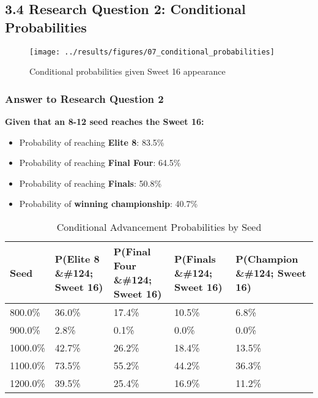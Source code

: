 \documentclass[
]{article}
\providecommand{\tightlist}{%
  \setlength{\itemsep}{0pt}\setlength{\parskip}{0pt}}
\begin{document}
\subsection{3.4 Research Question 2: Conditional
Probabilities}\label{research-question-2-conditional-probabilities}

\begin{figure}

{\centering \texttt{[image: ../results/figures/07\_conditional\_probabilities]} 

}

\caption{Conditional probabilities given Sweet 16 appearance}\label{fig:conditional-plot}
\end{figure}

\subsubsection{Answer to Research Question
2}\label{answer-to-research-question-2}

\textbf{Given that an 8-12 seed reaches the Sweet 16:}

\begin{itemize}
\tightlist
\item
  Probability of reaching \textbf{Elite 8}: 83.5\%
\item
  Probability of reaching \textbf{Final Four}: 64.5\%
\item
  Probability of reaching \textbf{Finals}: 50.8\%
\item
  Probability of \textbf{winning championship}: 40.7\%
\end{itemize}

\begin{longtable}[t]{lllll}
\caption{\label{tab:conditional-table}Conditional Advancement Probabilities by Seed}\\
\toprule
Seed & P(Elite 8 \&\#124; Sweet 16) & P(Final Four \&\#124; Sweet 16) & P(Finals \&\#124; Sweet 16) & P(Champion \&\#124; Sweet 16)\\
\midrule
800.0\% & 36.0\% & 17.4\% & 10.5\% & 6.8\%\\
900.0\% & 2.8\% & 0.1\% & 0.0\% & 0.0\%\\
1000.0\% & 42.7\% & 26.2\% & 18.4\% & 13.5\%\\
1100.0\% & 73.5\% & 55.2\% & 44.2\% & 36.3\%\\
1200.0\% & 39.5\% & 25.4\% & 16.9\% & 11.2\%\\
\bottomrule
\end{longtable}
\end{document}
